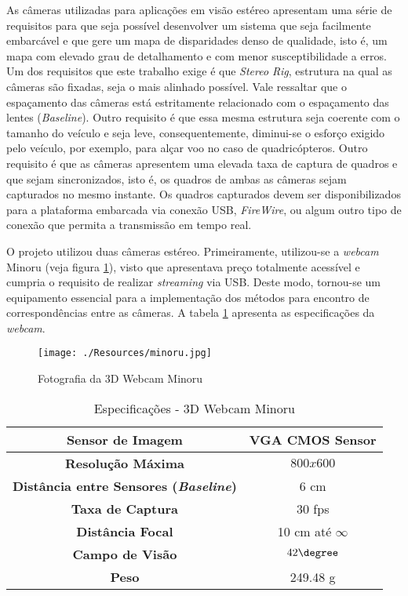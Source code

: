 As câmeras utilizadas para aplicações em visão estéreo apresentam uma série de requisitos para que seja possível desenvolver um sistema que seja facilmente embarcável e que gere um mapa de disparidades denso de qualidade, isto é, um mapa com elevado grau de detalhamento e com menor susceptibilidade a erros. Um dos requisitos que este trabalho exige é que \textit{Stereo Rig}, estrutura na qual as câmeras são fixadas, seja o mais alinhado possível. Vale ressaltar que o espaçamento das câmeras está estritamente relacionado com o espaçamento das lentes (\textit{Baseline}). Outro requisito é que essa mesma estrutura seja coerente com o tamanho do veículo e seja leve, consequentemente, diminui-se o esforço exigido pelo veículo, por exemplo, para alçar voo no caso de quadricópteros. Outro requisito é que as câmeras apresentem uma elevada taxa de captura de quadros e que sejam sincronizados, isto é, os quadros de ambas as câmeras sejam capturados no mesmo instante. Os quadros capturados devem ser disponibilizados para a plataforma embarcada via conexão USB, \textit{FireWire}, ou algum outro tipo de conexão que permita a transmissão em tempo real.

O projeto utilizou duas câmeras estéreo. Primeiramente, utilizou-se a \textit{webcam} Minoru (veja figura \ref{minoru}), visto que apresentava preço totalmente acessível e cumpria o requisito de realizar \textit{streaming} via USB. Deste modo, tornou-se um equipamento essencial para a implementação dos métodos para encontro de correspondências entre as câmeras. A tabela \ref{minoru_tab} apresenta as especificações da \textit{webcam}.

\begin{figure}[H]
	\centering
	\texttt{[image: ./Resources/minoru.jpg]}
	\caption{Fotografia da 3D Webcam Minoru}
	\label{minoru}
\end{figure}

\begin{table}[]
\centering
\caption{Especificações - 3D Webcam Minoru}
\label{minoru_tab}
\begin{tabular}{|c|c|}
\hline
\textbf{Sensor de Imagem}      & VGA CMOS Sensor  		\\	\hline
\textbf{Resolução Máxima}      & $800x600$        		\\	\hline
\textbf{Distância entre Sensores (\textit{Baseline})} & 6 cm    \\	\hline
\textbf{Taxa de Captura}       & 30 fps             		\\	\hline
\textbf{Distância Focal}       & 10 cm até $\infty$		\\	\hline
\textbf{Campo de Visão}        & $42\degree$			\\	\hline
\textbf{Peso}		       & 249.48 g			\\	\hline
\end{tabular}
\end{table}

